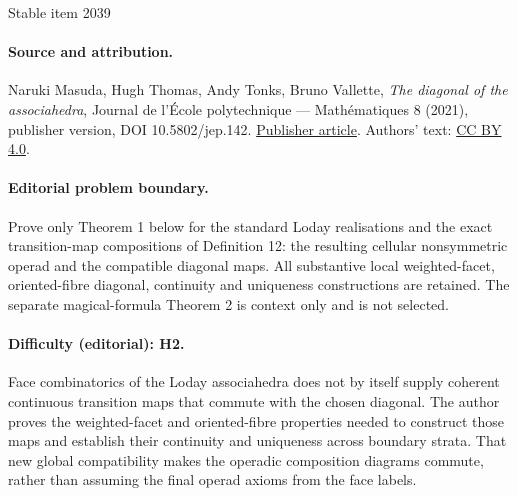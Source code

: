 \documentclass[11pt]{article}
\numberwithin{equation}{section}\providecommand{\No}{}
\begin{document}
\begin{center}{\Large Stable item 2039}\end{center}
\paragraph{Source and attribution.}
Naruki Masuda, Hugh Thomas, Andy Tonks, Bruno Vallette, \emph{The diagonal of the associahedra}, Journal de l’École polytechnique — Mathématiques 8 (2021), publisher version, DOI 10.5802/jep.142. \href{https://jep.centre-mersenne.org/articles/10.5802/jep.142/}{Publisher article}. Authors' text: \href{https://creativecommons.org/licenses/by/4.0/}{CC BY 4.0}.
\paragraph{Editorial problem boundary.}
Prove only Theorem 1 below for the standard Loday realisations and the exact transition-map compositions of Definition 12: the resulting cellular nonsymmetric operad and the compatible diagonal maps. All substantive local weighted-facet, oriented-fibre diagonal, continuity and uniqueness constructions are retained. The separate magical-formula Theorem 2 is context only and is not selected.
\paragraph{Difficulty (editorial): H2.}
Face combinatorics of the Loday associahedra does not by itself supply coherent continuous transition maps that commute with the chosen diagonal. The author proves the weighted-facet and oriented-fibre properties needed to construct those maps and establish their continuity and uniqueness across boundary strata. That new global compatibility makes the operadic composition diagrams commute, rather than assuming the final operad axioms from the face labels.
\end{document}
